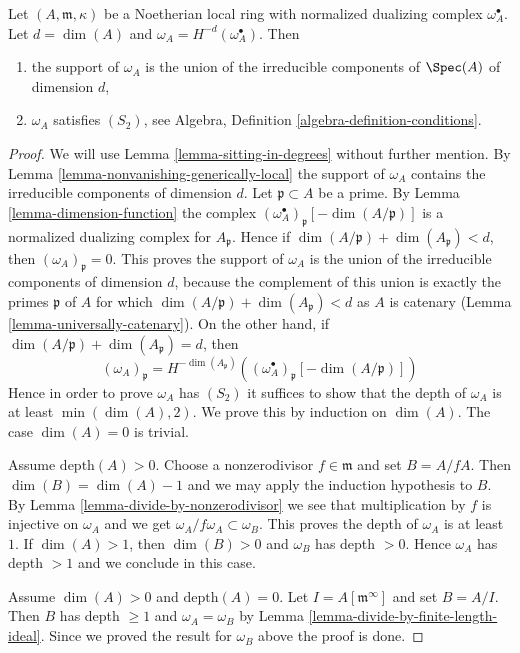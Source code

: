 \begin{lemma}
\label{lemma-depth-dualizing-module}
Let $(A, \mathfrak m, \kappa)$ be a Noetherian local ring with
normalized dualizing complex $\omega_A^\bullet$. Let $d = \dim(A)$
and $\omega_A = H^{-d}(\omega_A^\bullet)$. Then
\begin{enumerate}
\item the support of $\omega_A$ is the union of the irreducible components
of $\Spec(A)$ of dimension $d$,
\item $\omega_A$ satisfies $(S_2)$, see
Algebra, Definition \ref{algebra-definition-conditions}.
\end{enumerate}
\end{lemma}

\begin{proof}
We will use Lemma \ref{lemma-sitting-in-degrees} without further mention.
By Lemma \ref{lemma-nonvanishing-generically-local} the support
of $\omega_A$ contains the irreducible components of dimension $d$.
Let $\mathfrak p \subset A$ be a prime. By Lemma \ref{lemma-dimension-function}
the complex $(\omega_A^\bullet)_{\mathfrak p}[-\dim(A/\mathfrak p)]$
is a normalized dualizing complex for $A_\mathfrak p$. Hence if
$\dim(A/\mathfrak p) + \dim(A_\mathfrak p) < d$, then
$(\omega_A)_\mathfrak p = 0$.
This proves the support of $\omega_A$ is the union of the irreducible
components of dimension $d$, because the complement of this union
is exactly the primes $\mathfrak p$ of $A$ for which
$\dim(A/\mathfrak p) + \dim(A_\mathfrak p) < d$ as $A$ is catenary
(Lemma \ref{lemma-universally-catenary}).
On the other hand, if $\dim(A/\mathfrak p) + \dim(A_\mathfrak p) = d$, then
$$
(\omega_A)_\mathfrak p =
H^{-\dim(A_\mathfrak p)}\left(
(\omega_A^\bullet)_{\mathfrak p}[-\dim(A/\mathfrak p)] \right)
$$
Hence in order to prove $\omega_A$ has $(S_2)$ it suffices to show that
the depth of $\omega_A$ is at least $\min(\dim(A), 2)$.
We prove this by induction on $\dim(A)$. The case $\dim(A) = 0$ is
trivial.

\medskip\noindent
Assume $\text{depth}(A) > 0$. Choose a nonzerodivisor $f \in \mathfrak m$
and set $B = A/fA$. Then $\dim(B) = \dim(A) - 1$ and we may apply the
induction hypothesis to $B$. By Lemma \ref{lemma-divide-by-nonzerodivisor}
we see that multiplication by $f$ is injective on $\omega_A$ and we get
$\omega_A/f\omega_A \subset \omega_B$. This proves the depth of $\omega_A$
is at least $1$. If $\dim(A) > 1$, then $\dim(B) > 0$ and $\omega_B$
has depth $ > 0$. Hence $\omega_A$ has depth $> 1$ and we conclude in
this case.

\medskip\noindent
Assume $\dim(A) > 0$ and $\text{depth}(A) = 0$. Let
$I = A[\mathfrak m^\infty]$ and set $B = A/I$. Then $B$ has
depth $\geq 1$ and $\omega_A = \omega_B$ by
Lemma \ref{lemma-divide-by-finite-length-ideal}.
Since we proved the result for $\omega_B$ above the proof is done.
\end{proof}
